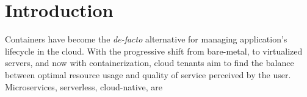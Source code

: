 \section{Introduction} \label{sec:introduction}

Containers have become the \textit{de-facto} alternative for managing application's lifecycle in the cloud.
With the progressive shift from bare-metal, to virtualized servers, and now with containerization, cloud tenants aim to find the balance between optimal resource usage and quality of service perceived by the user.
Microservices, serverless, cloud-native, are 
